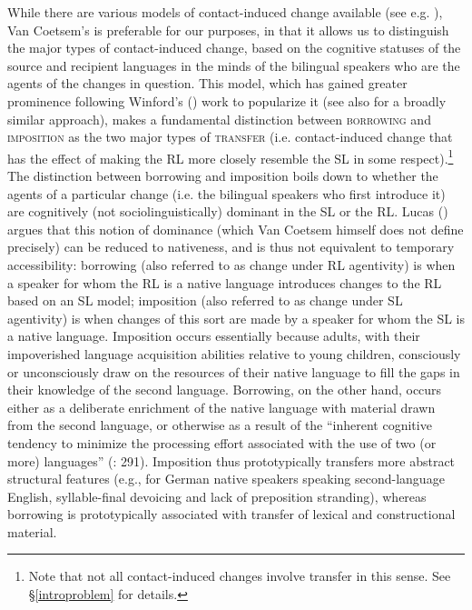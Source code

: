 \documentclass[output=paper]{langsci/langscibook}
\begin{document}
While there are various models of contact-induced change available (see e.g. \citealt{ThomasonKaufman1988,Johanson2002,Matras2009}), Van Coetsem's is preferable for our purposes, in that it allows us to distinguish the major types of contact-induced change, based on the cognitive statuses of the source and recipient languages in the minds of the bilingual speakers who are the agents of the changes in question. This model, which has gained greater prominence following Winford's (\citeyear{Winford2005,Winford2007,Winford2010}) work to popularize it (see also \citealt{Ross2013} for a broadly similar approach), makes a fundamental distinction between \textsc{borrowing} and \textsc{imposition} as the two major types of \textsc{transfer} (i.e. contact-induced change that has the effect of making the RL more closely resemble the SL in some respect).\footnote{Note that not all contact-induced changes involve transfer in this sense. See §\ref{introproblem} for details.} The distinction between borrowing and imposition boils down to whether the agents of a particular change (i.e. the bilingual speakers who first introduce it) are cognitively (not sociolinguistically) dominant in the SL or the RL. Lucas (\citeyear{Lucas2012,Lucas2015}) argues that this notion of dominance (which Van Coetsem himself does not define precisely) can be reduced to nativeness, and is thus not equivalent to temporary accessibility: borrowing (also referred to as change under RL agentivity) is when a speaker for whom the RL is a native language introduces changes to the RL based on an SL model; imposition (also referred to as change under SL agentivity) is when changes of this sort are made by a speaker for whom the SL is a native language. Imposition occurs essentially because adults, with their impoverished language acquisition abilities relative to young children, consciously or unconsciously draw on the resources of their native language to fill the gaps in their knowledge of the second language. Borrowing, on the other hand, occurs either as a deliberate enrichment of the native language with material drawn from the second language, or otherwise as a result of the ``inherent cognitive tendency to minimize the processing effort associated with the use of two (or more) languages'' (\citealt{Lucas2012}: 291). Imposition thus prototypically transfers more abstract structural features (e.g., for German native speakers speaking second-language English, syllable-final devoicing and lack of preposition stranding), whereas borrowing is prototypically associated with transfer of lexical and constructional material. 
\end{document}
